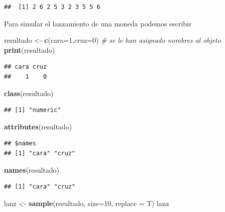 \documentclass[]{book}
\newenvironment{Shaded}{\begin{snugshade}}{\end{snugshade}}
\newcommand{\KeywordTok}[1]{\textcolor[rgb]{0.13,0.29,0.53}{\textbf{#1}}}
\newcommand{\DataTypeTok}[1]{\textcolor[rgb]{0.13,0.29,0.53}{#1}}
\newcommand{\DecValTok}[1]{\textcolor[rgb]{0.00,0.00,0.81}{#1}}
\newcommand{\StringTok}[1]{\textcolor[rgb]{0.31,0.60,0.02}{#1}}
\newcommand{\CommentTok}[1]{\textcolor[rgb]{0.56,0.35,0.01}{\textit{#1}}}
\newcommand{\NormalTok}[1]{#1}
\begin{document}
\begin{verbatim}
##  [1] 2 6 2 5 3 2 3 5 5 6
\end{verbatim}

Para simular el lanzamiento de una moneda podemos escribir

\begin{Shaded}
\begin{Highlighting}[]
\NormalTok{resultado <-}\StringTok{ }\KeywordTok{c}\NormalTok{(}\DataTypeTok{cara=}\DecValTok{1}\NormalTok{,}\DataTypeTok{cruz=}\DecValTok{0}\NormalTok{) }\CommentTok{# se le han asignado nombres al objeto}
\KeywordTok{print}\NormalTok{(resultado)}
\end{Highlighting}
\end{Shaded}

\begin{verbatim}
## cara cruz 
##    1    0
\end{verbatim}

\begin{Shaded}
\begin{Highlighting}[]
\KeywordTok{class}\NormalTok{(resultado)}
\end{Highlighting}
\end{Shaded}

\begin{verbatim}
## [1] "numeric"
\end{verbatim}

\begin{Shaded}
\begin{Highlighting}[]
\KeywordTok{attributes}\NormalTok{(resultado)}
\end{Highlighting}
\end{Shaded}

\begin{verbatim}
## $names
## [1] "cara" "cruz"
\end{verbatim}

\begin{Shaded}
\begin{Highlighting}[]
\KeywordTok{names}\NormalTok{(resultado)}
\end{Highlighting}
\end{Shaded}

\begin{verbatim}
## [1] "cara" "cruz"
\end{verbatim}

\begin{Shaded}
\begin{Highlighting}[]
\NormalTok{lanz <-}\StringTok{ }\KeywordTok{sample}\NormalTok{(resultado, }\DataTypeTok{size=}\DecValTok{10}\NormalTok{, }\DataTypeTok{replace =}\NormalTok{ T)}
\NormalTok{lanz}
\end{Highlighting}
\end{Shaded}
\end{document}
